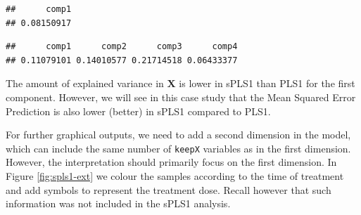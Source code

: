 \documentclass[]{book}
\newenvironment{Shaded}{\begin{snugshade}}{\end{snugshade}}
\newcommand{\DataTypeTok}[1]{\textcolor[rgb]{0.13,0.29,0.53}{#1}}
\newcommand{\DecValTok}[1]{\textcolor[rgb]{0.00,0.00,0.81}{#1}}
\newcommand{\KeywordTok}[1]{\textcolor[rgb]{0.13,0.29,0.53}{\textbf{#1}}}
\newcommand{\NormalTok}[1]{#1}
\newcommand{\OperatorTok}[1]{\textcolor[rgb]{0.81,0.36,0.00}{\textbf{#1}}}
\newcommand{\OtherTok}[1]{\textcolor[rgb]{0.56,0.35,0.01}{#1}}
\newcommand{\StringTok}[1]{\textcolor[rgb]{0.31,0.60,0.02}{#1}}
\begin{document}
\begin{verbatim}
##      comp1 
## 0.08150917
\end{verbatim}

\begin{Shaded}
\end{Shaded}

\begin{verbatim}
##      comp1      comp2      comp3      comp4 
## 0.11079101 0.14010577 0.21714518 0.06433377
\end{verbatim}

The amount of explained variance in \(\boldsymbol X\) is lower in sPLS1 than PLS1 for the first component. However, we will see in this case study that the Mean Squared Error Prediction is also lower (better) in sPLS1 compared to PLS1.

For further graphical outputs, we need to add a second dimension in the model, which can include the same number of \texttt{keepX} variables as in the first dimension. However, the interpretation should primarily focus on the first dimension. In Figure \ref{fig:spls1-ext} we colour the samples according to the time of treatment and add symbols to represent the treatment dose. Recall however that such information was not included in the sPLS1 analysis.

\begin{Shaded}
\end{Shaded}
\end{document}
